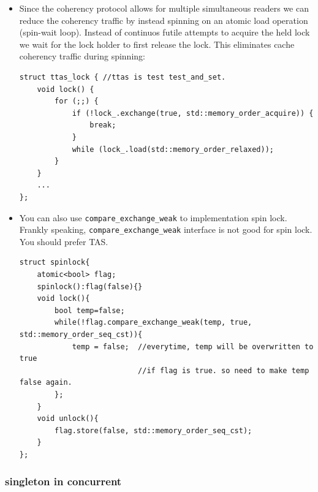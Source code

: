 \documentclass[a4paper,11pt,twoside]{book}
\begin{document}
\begin{itemize}
	\item Since the coherency protocol allows for multiple simultaneous readers we can reduce the coherency traffic by instead spinning on an atomic load operation (spin-wait loop). Instead of continuos futile attempts to acquire the held lock we wait for the lock holder to first release the lock. This eliminates cache coherency traffic during spinning:
\begin{lstlisting}[]
struct ttas_lock { //ttas is test test_and_set.
	void lock() {
		for (;;) {
			if (!lock_.exchange(true, std::memory_order_acquire)) {
				break;
			}
			while (lock_.load(std::memory_order_relaxed));
		}
	}
	...
};	
\end{lstlisting}	
	
	\item You can also use \texttt{compare\_exchange\_weak} to implementation spin lock. Frankly speaking, \texttt{compare\_exchange\_weak} interface is not good for spin lock.  You should prefer TAS. 
	
\begin{lstlisting}
struct spinlock{
	atomic<bool> flag;
	spinlock():flag(false){}
	void lock(){
		bool temp=false;
		while(!flag.compare_exchange_weak(temp, true, std::memory_order_seq_cst)){
			temp = false;  //everytime, temp will be overwritten to true
			               //if flag is true. so need to make temp false again.
		};
	}	
	void unlock(){
		flag.store(false, std::memory_order_seq_cst);
	}
};	
\end{lstlisting}	
	
\end{itemize}

\subsubsection{singleton in concurrent}
\end{document}
